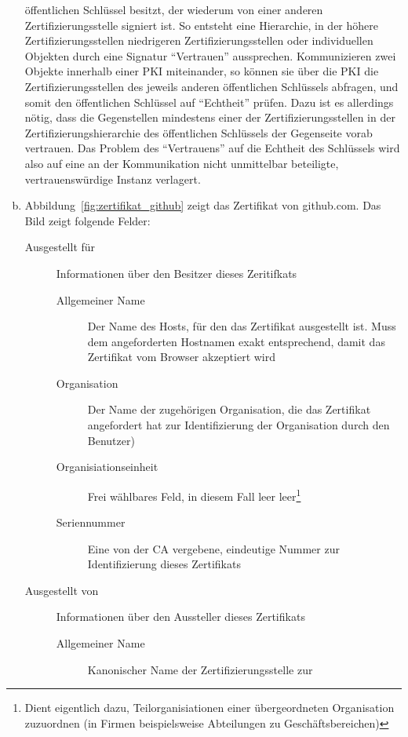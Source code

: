 \documentclass[11pt,a4paper]{scrartcl}
\begin{document}
\begin{enumerate}[a)]
  öffentlichen Schlüssel besitzt, der wiederum von einer anderen
  Zertifizierungsstelle signiert ist.  So entsteht eine Hierarchie, in der
  höhere Zertifizierungsstellen niedrigeren Zertifizierungsstellen oder
  individuellen Objekten durch eine Signatur \enquote{Vertrauen} aussprechen.
  Kommunizieren zwei Objekte innerhalb einer PKI miteinander, so können sie
  über die PKI die Zertifizierungsstellen des jeweils anderen öffentlichen
  Schlüssels abfragen, und somit den öffentlichen Schlüssel auf
  \enquote{Echtheit} prüfen.  Dazu ist es allerdings nötig, dass die
  Gegenstellen mindestens einer der Zertifizierungsstellen in der
  Zertifizierungshierarchie des öffentlichen Schlüssels der Gegenseite vorab
  vertrauen.  Das Problem des \enquote{Vertrauens} auf die Echtheit des
  Schlüssels wird also auf eine an der Kommunikation nicht unmittelbar
  beteiligte, vertrauenswürdige Instanz verlagert.
\item Abbildung~\ref{fig:zertifikat_github} zeigt das Zertifikat von
  github.com.  Das Bild zeigt folgende Felder:
  \begin{description}
    \item[Ausgestellt für] Informationen über den Besitzer dieses Zeritifkats
      \begin{description}
      \item[Allgemeiner Name] Der Name des Hosts, für den das Zertifikat
        ausgestellt ist.  Muss dem angeforderten Hostnamen exakt entsprechend,
        damit das Zertifikat vom Browser akzeptiert wird
      \item[Organisation] Der Name der zugehörigen Organisation, die das
        Zertifikat angefordert hat zur Identifizierung der Organisation durch
        den Benutzer)
      \item[Organisiationseinheit] Frei wählbares Feld, in diesem Fall leer
        leer\footnote{Dient eigentlich dazu, Teilorganisiationen einer
          übergeordneten Organisation zuzuordnen (in Firmen beispielsweise
          Abteilungen zu Geschäftsbereichen)}
      \item[Seriennummer] Eine von der CA vergebene, eindeutige Nummer zur
        Identifizierung dieses Zertifikats
    \end{description}
  \item[Ausgestellt von] Informationen über den Aussteller dieses Zertifikats
    \begin{description}
    \item[Allgemeiner Name] Kanonischer Name der Zertifizierungsstelle zur

\end{description}
\end{description}
\end{enumerate}
\end{document}
